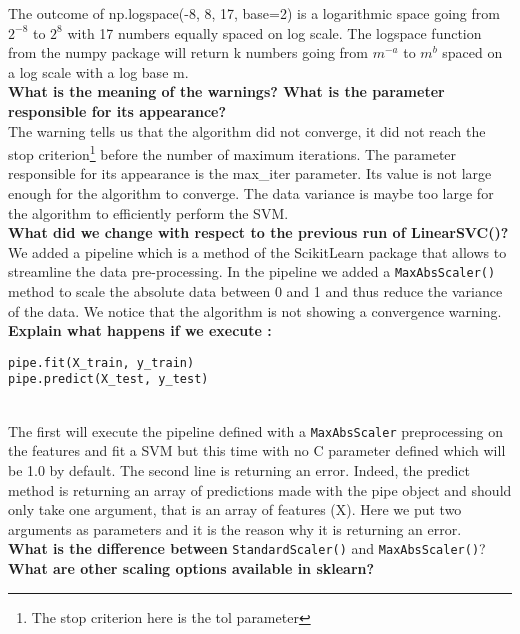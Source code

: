 The outcome of np.logspace(-8, 8, 17, base=2) is a logarithmic space going from $2^{-8}$ to $2^8$ with 17 numbers equally spaced on log scale.
 The logspace function from the numpy package will return k numbers going from $m^{-a}$ to $m^b$ spaced on a log scale with a log base m. \\

\textbf{What is the meaning of the warnings? What is the parameter responsible for its appearance?}\\

The warning tells us that the algorithm did not converge, it did not reach the stop criterion\footnote{The stop criterion here is the tol parameter} before the number of maximum iterations. The parameter responsible for its appearance is the max\_iter parameter. Its value is not large enough for the algorithm to converge. The data variance is maybe too large for the algorithm to efficiently perform the SVM. \\

\textbf{What did we change with respect to the previous run of LinearSVC()?} \\

We added a pipeline which is a method of the ScikitLearn package that allows to streamline the data pre-processing. In the pipeline we added a \verb|MaxAbsScaler()| method to scale the absolute data between 0 and 1 and thus reduce the variance of the data. We notice that the algorithm is not showing a convergence warning. \\

\textbf{Explain what happens if we execute :} 
\begin{verbatim}pipe.fit(X_train, y_train)
pipe.predict(X_test, y_test)\end{verbatim} \\
The first will execute the pipeline defined with a \verb|MaxAbsScaler|  preprocessing on the features and fit a SVM but this time with no C parameter defined which will be 1.0 by default. The second line is returning an error. Indeed, the predict method is returning an array of predictions made with the pipe object and should only take one argument, that is an array of features (X). Here we put two arguments as parameters and it is the reason why it is returning an error.  \\

\textbf{What is the difference between} \verb|StandardScaler()| and \verb|MaxAbsScaler()|? \textbf{What are other scaling options available in sklearn? }\\

